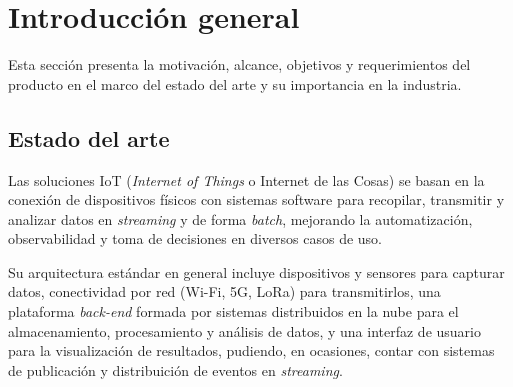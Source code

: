 
\chapter{Introducción general} %

\label{Chapter1} %
\label{IntroGeneral}

Esta sección presenta la motivación, alcance, objetivos y requerimientos del producto en el marco del estado del arte y su importancia en la industria.


\newcommand{\keyword}[1]{\textbf{#1}}
\newcommand{\tabhead}[1]{\textbf{#1}}
\newcommand{\code}[1]{\texttt{#1}}
\newcommand{\file}[1]{\texttt{\bfseries#1}}
\newcommand{\option}[1]{\texttt{\itshape#1}}
\newcommand{\grados}{$^{\circ}$}



\section{Estado del arte}

Las soluciones IoT (\textit{Internet of Things} o Internet de las Cosas) se basan en la conexión de dispositivos físicos con sistemas software para recopilar, transmitir y analizar datos en \textit{streaming} y de forma \textit{batch}, mejorando la automatización, observabilidad y toma de decisiones en diversos casos de uso. 

Su arquitectura estándar en general incluye dispositivos y sensores para capturar datos, conectividad por red (Wi-Fi, 5G, LoRa) para transmitirlos, una plataforma \textit{back-end} formada por sistemas distribuidos en la nube para el almacenamiento, procesamiento y análisis de datos, y una interfaz de usuario para la visualización de resultados, pudiendo, en ocasiones, contar con sistemas de publicación y distribuición de eventos en \textit{streaming}.

